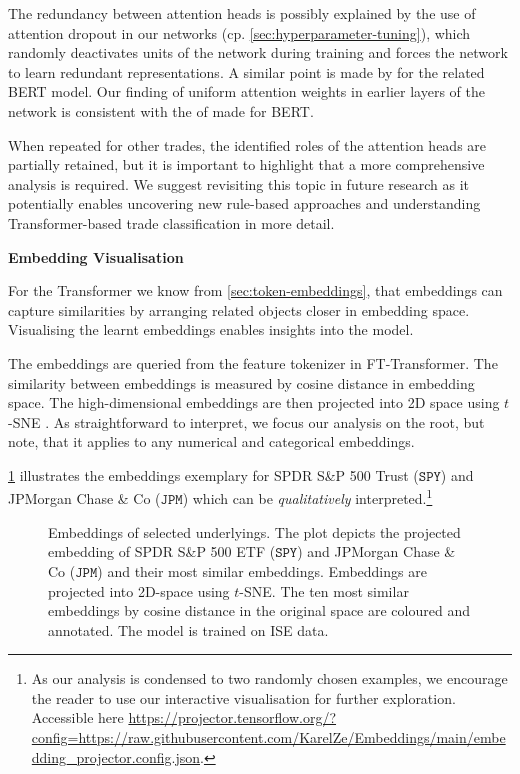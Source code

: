 The redundancy between attention heads is possibly explained by the use of attention dropout in our networks (cp. \cref{sec:hyperparameter-tuning}), which randomly deactivates units of the network during training and forces the network to learn redundant representations. A similar point is made by \textcite[][8--9]{clarkWhatDoesBERT2019} for the related \gls{BERT} model. Our finding of uniform attention weights in earlier layers of the network is consistent with the of \textcite[][4]{abnarQuantifyingAttentionFlow2020} made for \gls{BERT}.

When repeated for other trades, the identified roles of the attention heads are partially retained, but it is important to highlight that a more comprehensive analysis is required. We suggest revisiting this topic in future research as it potentially enables uncovering new rule-based approaches and understanding Transformer-based trade classification in more detail.

\textbf{Embedding Visualisation}

For the Transformer we know from \cref{sec:token-embeddings}, that embeddings can capture similarities by arranging related objects closer in embedding space. Visualising the learnt embeddings enables insights into the model.

The embeddings are queried from the feature tokenizer in FT-Transformer. The similarity between embeddings is measured by cosine distance in embedding space. The high-dimensional embeddings are then projected into 2D space using $t$-SNE \autocite[][2587]{vandermaatenVisualizingDataUsing2008}. As straightforward to interpret, we focus our analysis on the root, but note, that it applies to any numerical and categorical embeddings.

\cref{fig:categorical-embeddings} illustrates the embeddings exemplary for SPDR S\&P 500 Trust ($\mathtt{SPY}$) and JPMorgan Chase \& Co ($\mathtt{JPM}$) which can be \emph{qualitatively} interpreted.\footnote{As our analysis is condensed to two randomly chosen examples, we encourage the reader to use our interactive visualisation for further exploration. Accessible here \url{https://projector.tensorflow.org/?config=https://raw.githubusercontent.com/KarelZe/Embeddings/main/embedding_projector.config.json}.}

\begin{figure}[h!]
    \vfill
    \caption[Embeddings of Selected Underlyings]{Embeddings of selected underlyings. The plot depicts the projected embedding of SPDR S\&P 500 ETF ($\mathtt{SPY}$) and JPMorgan Chase \& Co ($\mathtt{JPM}$) and their most similar embeddings. Embeddings are projected into 2D-space using $t$-SNE. The ten most similar embeddings by cosine distance in the original space are coloured and annotated. The model is trained on \gls{ISE} data.}
    \label{fig:categorical-embeddings}
\end{figure}

